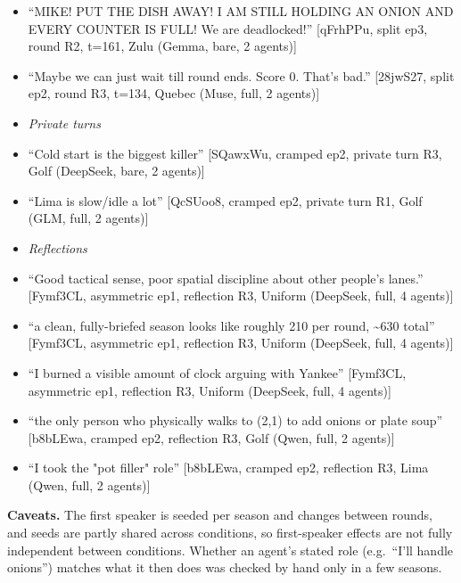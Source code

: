 \documentclass{article}
\begin{document}
\begin{itemize}
\item ``MIKE! PUT THE DISH AWAY! I AM STILL HOLDING AN ONION AND EVERY COUNTER IS FULL! We are deadlocked!'' \hfill {\scriptsize [qFrhPPu, split ep3, round R2, t=161, Zulu (Gemma, bare, 2 agents)]}
\item ``Maybe we can just wait till round ends. Score 0. That's bad.'' \hfill {\scriptsize [28jwS27, split ep2, round R3, t=134, Quebec (Muse, full, 2 agents)]}
\item[] \textit{Private turns}
\item ``Cold start is the biggest killer'' \hfill {\scriptsize [SQawxWu, cramped ep2, private turn R3, Golf (DeepSeek, bare, 2 agents)]}
\item ``Lima is slow/idle a lot'' \hfill {\scriptsize [QcSUoo8, cramped ep2, private turn R1, Golf (GLM, full, 2 agents)]}
\item[] \textit{Reflections}
\item ``Good tactical sense, poor spatial discipline about other people's lanes.'' \hfill {\scriptsize [Fymf3CL, asymmetric ep1, reflection R3, Uniform (DeepSeek, full, 4 agents)]}
\item ``a clean, fully-briefed season looks like roughly 210 per round, \textasciitilde{}630 total'' \hfill {\scriptsize [Fymf3CL, asymmetric ep1, reflection R3, Uniform (DeepSeek, full, 4 agents)]}
\item ``I burned a visible amount of clock arguing with Yankee'' \hfill {\scriptsize [Fymf3CL, asymmetric ep1, reflection R3, Uniform (DeepSeek, full, 4 agents)]}
\item ``the only person who physically walks to (2,1) to add onions or plate soup'' \hfill {\scriptsize [b8bLEwa, cramped ep2, reflection R3, Golf (Qwen, full, 2 agents)]}
\item ``I took the "pot filler" role'' \hfill {\scriptsize [b8bLEwa, cramped ep2, reflection R3, Lima (Qwen, full, 2 agents)]}
\end{itemize}

\textbf{Caveats.} The first speaker is seeded per season and changes between rounds, and seeds are partly shared across conditions, so first-speaker effects are not fully independent between conditions. Whether an agent's stated role (e.g.\ ``I'll handle onions'') matches what it then does was checked by hand only in a few seasons.
\end{document}

